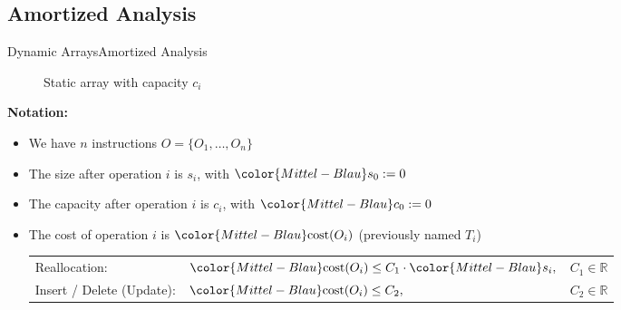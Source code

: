 \subsection{Amortized Analysis}

\begin{frame}{Dynamic Arrays}{Amortized Analysis}
  \vspace*{-1.0em}
  \begin{figure}[!t]%
    \def\FSAsize{16}\def\FSAelements{11}%
    \def\FSAcopy{0}\def\FSAdelete{0}\def\FSAinsert{0}%
    \def \FSAcopyarrow{1}%
    \def\FSAlabelsize{Size ${\color{Mittel-Blau}s_i}$}%
    \def\FSAlabelcapacity{Capacity ${\color{Mittel-Blau}c_i}$}%
    \vspace*{-0.5em}%
    \caption{Static array with capacity $c_i$}%
    \label{fig:array_amortized analysis}%
  \end{figure}%
  \vspace*{-1.0em}
  \textbf{Notation:}%
  \begin{itemize}%
    \item
      We have $n$ instructions $O = \{O_1,\dots,O_n\}$
    \item
      The {\color{Mittel-Blau}size} after operation $i$ is
      {\color{Mittel-Blau}$s_i$},
      with ${\color{Mittel-Blau}s_0} := 0$
    \item
      The {\color{Mittel-Blau}capacity} after operation $i$ is
      {\color{Mittel-Blau}$c_i$},
      with ${\color{Mittel-Blau}c_0} := 0$
    \item
      The {\color{Mittel-Blau}cost} of operation $i$ is
      ${\color{Mittel-Blau}\mathrm{cost}(O_i)}$
      (previously named $T_i$)\\[0.5em]
      \begin{tabular}{lll}
        Reallocation: &
        ${\color{Mittel-Blau}\mathrm{cost}(O_i)}
          \leq C_1 \cdot {\color{Mittel-Blau}s_i},$ &
        $C_1 \in \mathbb{R}$\\
        Insert / Delete (Update): &
        ${\color{Mittel-Blau}\mathrm{cost}(O_i)}
          \leq C_2,$ &
        $C_2 \in \mathbb{R}$
      \end{tabular}
  \end{itemize}
\end{frame}


